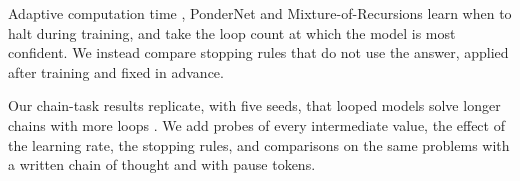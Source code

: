Adaptive computation time \citep{graves2016adaptive}, PonderNet \citep{banino2021pondernet} and Mixture-of-Recursions
\citep{bae2025mixture} learn when to halt during training, and \citet{fan2025looped} take the loop count at which the
model is most confident. We instead compare stopping rules that do not use the answer, applied after training and fixed in advance.

Our chain-task results replicate, with five seeds, that looped models solve longer chains with more loops
\citep{kohli2026loop,zhang2026recurrence}. We add probes of every intermediate value, the effect of the learning rate,
the stopping rules, and comparisons on the same problems with a written chain of thought and with pause tokens.
